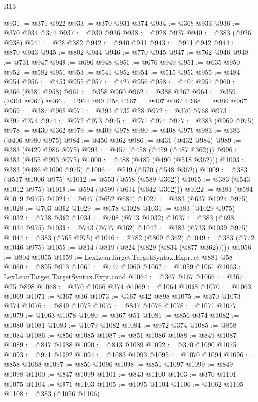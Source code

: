 \begin{lexlean}{R13}
\begin{coremodule}
@931 := @371 @922
@933 := @370 @931 @374
@934 := @368 @933
@936 := @370 @934 @374
@937 := @930 @936
@938 := @928 @937
@940 := @383 (@926 @938)
@941 := @28 @382
@942 := @940 @941
@943 := @911 @942
@944 := @870 @943
@945 := @802 @944
@946 := @770 @945
@947 := @762 @946
@948 := @731 @947
@949 := @696 @948
@950 := @676 @949
@951 := @635 @950
@952 := @582 @951
@953 := @541 @952
@954 := @515 @953
@955 := @484 @954
@956 := @453 @955
@957 := @427 @956
@958 := @404 @957
@960 := @366 (@381 @958)
@961 := @358 @960
@962 := @388 @362
@964 := @359 (@361 @962)
@966 := @964 @99 @58
@967 := @407 @362
@968 := @389 @967
@969 := @387 @968
@971 := @393 @732 @58
@972 := @370 @768
@973 := @397 @374
@974 := @972 @973
@975 := @971 @974
@977 := @383 (@969 @975)
@978 := @430 @362
@979 := @409 @978
@980 := @408 @979
@983 := @383 (@406 @980 @975)
@984 := @456 @362
@986 := @431 (@432 @984)
@989 := @383 (@429 @986 @975)
@993 := @457 (@458 (@459 (@487 @362)))
@996 := @383 (@455 @993 @975)
@1000 := @488 (@489 (@490 (@518 @362)))
@1003 := @383 (@486 @1000 @975)
@1006 := @519 (@520 (@548 @362))
@1009 := @383 (@517 @1006 @975)
@1012 := @553 (@558 (@589 @362))
@1015 := @383 (@543 @1012 @975)
@1019 := @594 (@599 (@604 (@642 @362)))
@1022 := @383 (@584 @1019 @975)
@1024 := @647 (@652 @684)
@1027 := @383 (@637 @1024 @975)
@1028 := @703 @362
@1029 := @678 @1028
@1031 := @383 (@1029 @975)
@1032 := @738 @362
@1034 := @708 (@713 @1032)
@1037 := @383 (@698 @1034 @975)
@1039 := @743 (@777 @362)
@1042 := @383 (@733 @1039 @975)
@1044 := @383 (@765 @975)
@1046 := @782 (@809 @362)
@1049 := @383 (@772 @1046 @975)
@1055 := @814 (@819 (@824 (@829 (@834 (@877 @362)))))
@1056 := @804 @1055
@1059 := LexLeanTarget.TargetSyntax.Expr.let @881 @58
@1060 := @895 @973
@1061 := @747 @1060
@1062 := @1059 @1061
@1063 := LexLeanTarget.TargetSyntax.Expr.cond
@1064 := @367 @167
@1066 := @367 @25 @898
@1068 := @370 @1066 @374
@1069 := @1064 @1068
@1070 := @1063 @1069
@1071 := @367 @36
@1073 := @367 @42 @898
@1075 := @370 @1073 @374
@1076 := @849 @1075
@1077 := @847 @1076
@1078 := @1071 @1077
@1079 := @1063 @1078
@1080 := @367 @51
@1081 := @856 @374
@1082 := @1080 @1081
@1083 := @1079 @1082
@1084 := @972 @374
@1085 := @858 @1084
@1086 := @856 @1085
@1087 := @851 @1086
@1088 := @849 @1087
@1089 := @847 @1088
@1090 := @843 @1089
@1092 := @370 @1090 @1075
@1093 := @971 @1092
@1094 := @1083 @1093
@1095 := @1070 @1094
@1096 := @858 @1068
@1097 := @856 @1096
@1098 := @851 @1097
@1099 := @849 @1098
@1100 := @847 @1099
@1101 := @843 @1100
@1103 := @370 @1101 @1075
@1104 := @971 @1103
@1105 := @1095 @1104
@1106 := @1062 @1105
@1108 := @383 (@1056 @1106)

\end{coremodule}
\end{lexlean}
